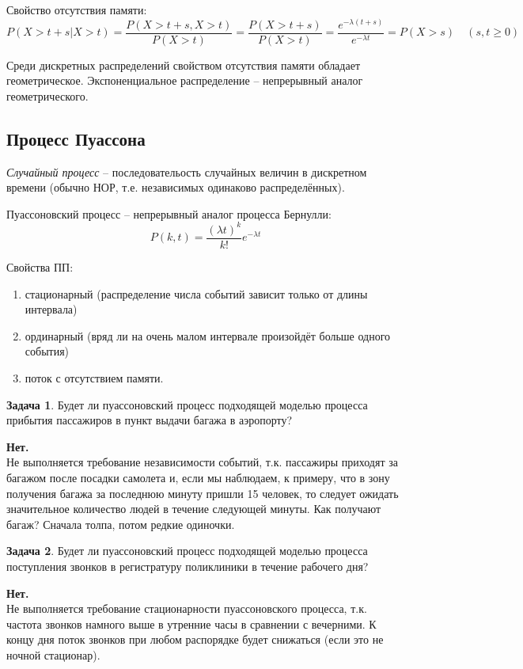 \documentclass[a4paper,12pt]{article}
\newenvironment{onsamepage} {\begin{minipage}{\textwidth}} {\end{minipage}}
\numberwithin{figure}{section}
\theoremstyle{definition}
\newtheorem{problem}{Задача}[section]
\let\geqs\geqslant
\begin{document}
Свойство отсутствия памяти:
\[ P(X>t+s|X>t) = \frac{P(X>t+s,X>t)}{P(X>t)} = \frac{P(X>t+s)}{P(X>t)} =
   \frac{e^{-\lambda(t+s)}}{e^{-\lambda t}}=P(X>s) \quad (s,t\!\geqs\!0) \]

Среди дискретных распределений свойством отсутствия памяти обладает геометрическое.
Экспоненциальное распределение -- непрерывный аналог геометрического.


\subsection{Процесс Пуассона}

\textit{Случайный процесс} -- последовательость случайных величин в дискретном времени
(обычно НОР, т.е. независимых одинаково распределённых).


Пуассоновский процесс -- непрерывный аналог процесса Бернулли:
	\[ P(k,t) = \frac{(\lambda t)^k}{k!} e^{-\lambda t} \]


Свойства ПП:
\begin{enumerate}
	\item стационарный (распределение числа событий зависит только от длины интервала)
	\item ординарный (вряд ли на очень малом интервале произойдёт больше одного события)
	\item поток с отсутствием памяти.
\end{enumerate}


\begin{problem}
	Будет ли пуассоновский процесс подходящей моделью процесса
	прибытия пассажиров в пункт выдачи багажа в аэропорту?
\end{problem}
\begin{solution}
  \textbf{Нет.}\\
	Не выполняется требование независимости событий, т.к.
	пассажиры приходят за багажом после посадки самолета и, если мы наблюдаем,
	к примеру, что в зону получения багажа за последнюю минуту пришли 15 человек,
	то следует ожидать значительное количество людей в течение следующей минуты.
	Как получают багаж? Сначала толпа, потом редкие одиночки.
\end{solution}


\begin{onsamepage}
\begin{problem}
	Будет ли пуассоновский процесс подходящей моделью процесса поступления
	звонков в регистратуру поликлиники в течение рабочего дня?
\end{problem}
\begin{solution}
  \textbf{Нет.}\\
	Не выполняется требование стационарности пуассоновского процесса, т.к.
	частота звонков намного выше в утренние часы в сравнении с вечерними.
	К концу дня поток звонков при любом распорядке будет снижаться
	(если это не ночной стационар).
\end{solution}
\end{onsamepage}
\end{document}
